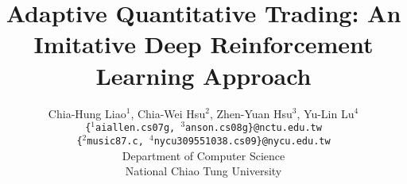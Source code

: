 \documentclass{article}
\title{Adaptive Quantitative Trading: An Imitative Deep Reinforcement Learning Approach}
\author{%
  Chia-Hung Liao$^1$, Chia-Wei Hsu$^2$, Zhen-Yuan Hsu$^3$, Yu-Lin Lu$^4$\\
  
  \texttt{\{$^1$aiallen.cs07g, $^3$anson.cs08g\}@nctu.edu.tw}\\
  \texttt{\{$^2$music87.c, $^4$nycu309551038.cs09\}@nycu.edu.tw}\\
  Department of Computer Science\\
  National Chiao Tung University\\
}
\begin{document}
\maketitle











{
\small


}
\end{document}
